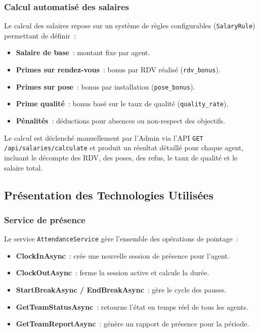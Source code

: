 \subsubsection{Calcul automatisé des salaires}

Le calcul des salaires repose sur un système de règles configurables (\texttt{SalaryRule})
permettant de définir~:

\begin{itemize}
    \item \textbf{Salaire de base}~: montant fixe par agent.
    \item \textbf{Primes sur rendez-vous}~: bonus par RDV réalisé (\texttt{rdv\_bonus}).
    \item \textbf{Primes sur pose}~: bonus par installation (\texttt{pose\_bonus}).
    \item \textbf{Prime qualité}~: bonus basé sur le taux de qualité (\texttt{quality\_rate}).
    \item \textbf{Pénalités}~: déductions pour absences ou non-respect des objectifs.
\end{itemize}

Le calcul est déclenché manuellement par l'Admin via l'API \texttt{GET /api/salaries/calculate}
et produit un résultat détaillé pour chaque agent, incluant le décompte des RDV, des poses,
des refus, le taux de qualité et le salaire total.

\subsection{Présentation des Technologies Utilisées}
\label{subsec:sprint5_tech}

\subsubsection{Service de présence}

Le service \texttt{AttendanceService} gère l'ensemble des opérations de pointage~:

\begin{itemize}
    \item \textbf{ClockInAsync}~: crée une nouvelle session de présence pour l'agent.
    \item \textbf{ClockOutAsync}~: ferme la session active et calcule la durée.
    \item \textbf{StartBreakAsync / EndBreakAsync}~: gère le cycle des pauses.
    \item \textbf{GetTeamStatusAsync}~: retourne l'état en temps réel de tous les agents.
    \item \textbf{GetTeamReportAsync}~: génère un rapport de présence pour la période.
\end{itemize}

